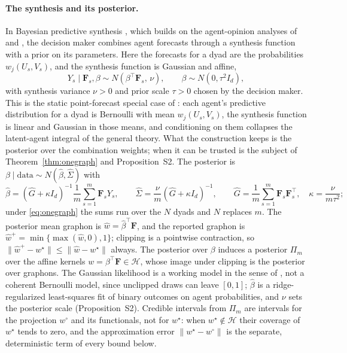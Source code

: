 \documentclass[12pt]{article}
\newcommand{\calH}{\mathcal{H}}
\newcommand{\norm}[1]{\|#1\|}
\newcommand{\wstar}{w^{\star}}
\newcommand{\wproj}{w^{\circ}}
\newcommand{\what}{\hat w}
\newcommand{\whatp}{\hat w^{+}}
\newcommand{\bhat}{\hat\beta}
\newcommand{\Sighat}{\hat\Sigma}
\newcommand{\Ghat}{\hat G}
\newcommand{\Fv}{\mathbf{F}}
\begin{document}
\paragraph{The synthesis and its posterior.}
In Bayesian predictive synthesis \citep{McAlinnWest2019}, which builds on the agent-opinion analyses of \citet{West1984} and \citet{West1992}, the decision maker combines agent forecasts through a synthesis function with a prior on its parameters. Here the forecasts for a dyad are the probabilities $w_j(U_s,V_s)$, and the synthesis function is Gaussian and affine,
\begin{equation}
\label{eq:synthesis}
Y_s\mid\Fv_s,\beta\sim N(\beta^{\top}\Fv_s,\,\nu),\qquad \beta\sim N(0,\tau^2 I_d),
\end{equation}
with synthesis variance $\nu>0$ and prior scale $\tau>0$ chosen by the decision maker. This is the static point-forecast special case of \citet{McAlinnWest2019}: each agent's predictive distribution for a dyad is Bernoulli with mean $w_j(U_s,V_s)$, the synthesis function is linear and Gaussian in those means, and conditioning on them collapses the latent-agent integral of the general theory. What the construction keeps is the posterior over the combination weights; when it can be trusted is the subject of Theorem~\ref{thm:onegraph} and Proposition~S2. The posterior is $\beta\mid\text{data}\sim N(\bhat,\Sighat)$ with
\begin{equation}
\label{eq:posterior}
\bhat=(\Ghat+\kappa I_d)^{-1}\frac1m\sum_{s=1}^{m}\Fv_sY_s,\qquad \Sighat=\frac{\nu}{m}(\Ghat+\kappa I_d)^{-1},\qquad \Ghat=\frac1m\sum_{s=1}^{m}\Fv_s\Fv_s^{\top},\quad \kappa=\frac{\nu}{m\tau^2};
\end{equation}
under \eqref{eq:onegraph} the sums run over the $N$ dyads and $N$ replaces $m$. The posterior mean graphon is $\what=\bhat^{\top}\Fv$, and the reported graphon is $\whatp=\min\{\max(\what,0),1\}$; clipping is a pointwise contraction, so $\norm{\whatp-\wstar}\le\norm{\what-\wstar}$ always. The posterior over $\beta$ induces a posterior $\Pi_m$ over the affine kernels $w=\beta^{\top}\Fv\in\calH$, whose image under clipping is the posterior over graphons. The Gaussian likelihood is a working model in the sense of \citet{West1992}, not a coherent Bernoulli model, since unclipped draws can leave $[0,1]$; $\bhat$ is a ridge-regularized least-squares fit of binary outcomes on agent probabilities, and $\nu$ sets the posterior scale (Proposition~S2). Credible intervals from $\Pi_m$ are intervals for the projection $\wproj$ and its functionals, not for $\wstar$: when $\wstar\notin\calH$ their coverage of $\wstar$ tends to zero, and the approximation error $\norm{\wstar-\wproj}$ is the separate, deterministic term of every bound below.
\end{document}
